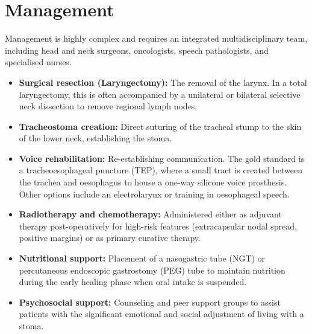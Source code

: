 \section*{Management}
Management is highly complex and requires an integrated multidisciplinary team, including head and neck surgeons, oncologists, speech pathologists, and specialised nurses.
\begin{itemize}
    \item \textbf{Surgical resection (Laryngectomy):} The removal of the larynx. In a total laryngectomy, this is often accompanied by a unilateral or bilateral selective neck dissection to remove regional lymph nodes.
    \item \textbf{Tracheostoma creation:} Direct suturing of the tracheal stump to the skin of the lower neck, establishing the stoma.
    \item \textbf{Voice rehabilitation:} Re-establishing communication. The gold standard is a tracheoesophageal puncture (TEP), where a small tract is created between the trachea and oesophagus to house a one-way silicone voice prosthesis. Other options include an electrolarynx or training in oesophageal speech.
    \item \textbf{Radiotherapy and chemotherapy:} Administered either as adjuvant therapy post-operatively for high-risk features (extracapsular nodal spread, positive margins) or as primary curative therapy.
    \item \textbf{Nutritional support:} Placement of a nasogastric tube (NGT) or percutaneous endoscopic gastrostomy (PEG) tube to maintain nutrition during the early healing phase when oral intake is suspended.
    \item \textbf{Psychosocial support:} Counseling and peer support groups to assist patients with the significant emotional and social adjustment of living with a stoma.
\end{itemize}

